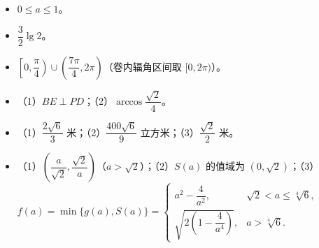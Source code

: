 \begin{itemize}[leftmargin=2.6em]
  \item[\textbf{17.}] $0\le a\le1$。
  \item[\textbf{18.}] $\dfrac32\lg2$。
  \item[\textbf{19.}] $\left[0,\dfrac\pi4\right)\cup\left(\dfrac{7\pi}4,2\pi\right)$（卷内辐角区间取 $[0,2\pi)$）。
  \item[\textbf{20.}] （1）$BE\perp PD$；（2）$\arccos\dfrac{\sqrt2}{4}$。
  \item[\textbf{21.}] （1）$\dfrac{2\sqrt6}{3}$ 米；（2）$\dfrac{400\sqrt6}{9}$ 立方米；（3）$\dfrac{\sqrt2}{2}$ 米。
  \item[\textbf{22.}] （1）$\left(\dfrac{a}{\sqrt2},\dfrac{\sqrt2}{a}\right)$（$a>\sqrt2$）；（2）$S(a)$ 的值域为 $(0,\sqrt2)$；（3）$\displaystyle f(a)=\min\{g(a),S(a)\}=\begin{cases}a^2-\dfrac{4}{a^2},&\sqrt2<a\le\sqrt[4]{6},\\[2pt]\sqrt{2\left(1-\dfrac{4}{a^4}\right)},&a>\sqrt[4]{6}.\end{cases}$
\end{itemize}
